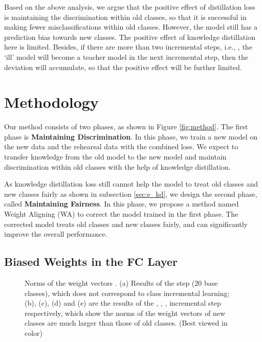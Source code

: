 \documentclass[10pt,twocolumn,letterpaper]{article}
\begin{document}
Based on the above analysis, we argue that the positive effect of distillation loss is maintaining the discrimination within old classes, so that it is successful in making fewer misclassifications within old classes. However, the model still has a prediction bias towards new classes. The positive effect of knowledge distillation here is limited. Besides, if there are more than two incremental steps, i.e., , the `ill' model will become a teacher model in the next incremental step, then the deviation will accumulate, so that the positive effect will be further limited.


\section{Methodology}\label{sec:method}
Our method consists of two phases, as shown in Figure \ref{fig:method}. The first phase is \textbf{Maintaining Discrimination}. In this phase, we train a new model on the new data and the rehearsal data with the combined loss. We expect to transfer knowledge from the old model to the new model and maintain discrimination within old classes with the help of knowledge distillation. 

As knowledge distillation loss still cannot help the model to treat old classes and new classes fairly as shown in subsection \ref{sec:e_kd}, we design the second phase, called \textbf{Maintaining Fairness}. In this phase, we propose a method named Weight Aligning (WA) to correct the model trained in the first phase. The corrected model treats old classes and new classes fairly, and can significantly improve the overall performance.


\subsection{Biased Weights in the FC Layer}\label{sec:biased_weights}

\begin{figure*}[t]
\centering
{}
\caption{Norms of the weight vectors . (a) Results of the  step (20 base classes), which does not correspond to class incremental learning; (b), (c), (d) and (e) are the results of the , , ,  incremental step respectively, which show the norms of the weight vectors of new classes are much larger than those of old classes. (Best viewed in color)}
\label{fig:norms}
\end{figure*}
\end{document}
